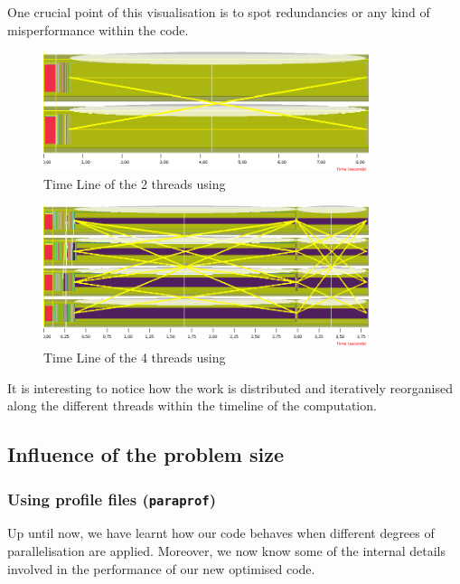 One crucial point of this visualisation is to spot redundancies or any kind of misperformance within the code.

\begin{figure}[H]
	\centering
	\includegraphics[width=0.85\textwidth]{images/trace2b}
	\caption{Time Line of the 2 threads using }
	\label{fig:jumpshot2}
\end{figure}

\begin{figure}[H]
	\centering
	\includegraphics[width=0.85\textwidth]{images/trace4c}
	\caption{Time Line of the 4 threads using }
	\label{fig:jumpshot4}
\end{figure}

It is interesting to notice how the work is distributed and iteratively reorganised along the different threads within the timeline of the computation.

\subsection{Influence of the problem size}

\subsubsection{Using profile files (\texttt{paraprof})}

Up until now, we have learnt how our code behaves when different degrees of parallelisation are applied. Moreover, we now know some of the internal details involved in the performance of our new optimised code. 

